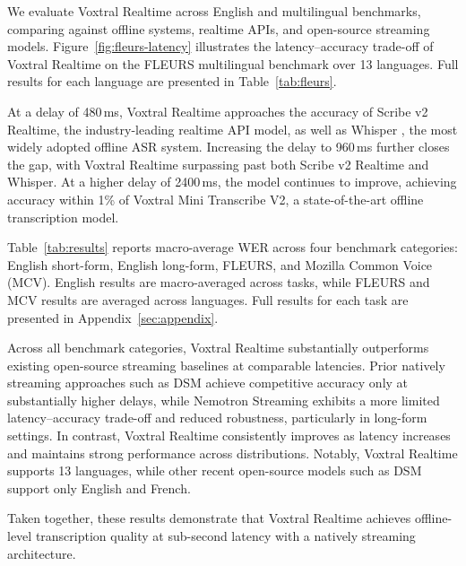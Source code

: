 We evaluate Voxtral Realtime across English and multilingual benchmarks, comparing against offline systems, realtime APIs, and open-source streaming models. Figure~\ref{fig:fleurs-latency} illustrates the latency--accuracy trade-off of Voxtral Realtime on the FLEURS multilingual benchmark over 13 languages. Full results for each language are presented in Table~\ref{tab:fleurs}. %

At a delay of 480\,ms, Voxtral Realtime approaches the accuracy of Scribe v2 Realtime, the industry-leading realtime API model, as well as Whisper \citep{radford2023whisper}, the most widely adopted offline ASR system. Increasing the delay to 960\,ms further closes the gap, with Voxtral Realtime surpassing past both Scribe v2 Realtime and Whisper. At a higher delay of 2400\,ms, the model continues to improve, achieving accuracy within 1\% of Voxtral Mini Transcribe V2, a state-of-the-art offline transcription model.

Table~\ref{tab:results} reports macro-average WER across four benchmark categories: English short-form, English long-form, FLEURS, and Mozilla Common Voice (MCV). English results are macro-averaged across tasks, while FLEURS and MCV results are averaged across languages. Full results for each task are presented in Appendix~\ref{sec:appendix}.

Across all benchmark categories, Voxtral Realtime substantially outperforms existing open-source streaming baselines at comparable latencies. Prior natively streaming approaches such as DSM achieve competitive accuracy only at substantially higher delays, while Nemotron Streaming \citep{noroozi2024nemotron} exhibits a more limited latency--accuracy trade-off and reduced robustness, particularly in long-form settings. In contrast, Voxtral Realtime consistently improves as latency increases and maintains strong performance across distributions. Notably, Voxtral Realtime supports 13 languages, while other recent open-source models such as DSM support only English and French. %

Taken together, these results demonstrate that Voxtral Realtime achieves offline-level transcription quality at sub-second latency with a natively streaming architecture.
